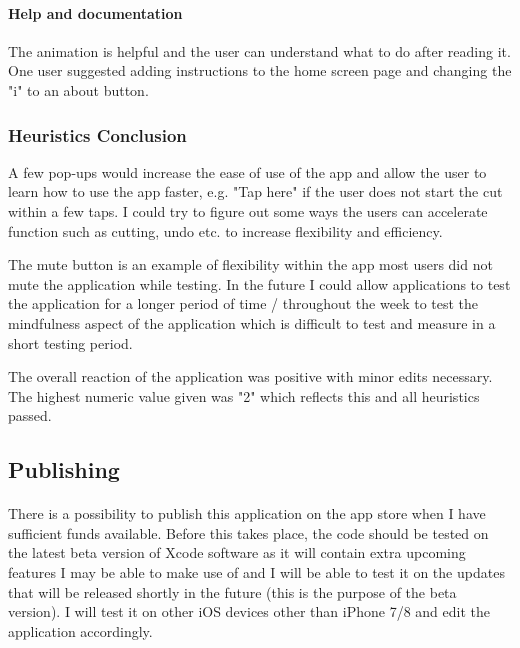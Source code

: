 \documentclass[11pt]{article}
\begin{document}
                \paragraph{Help and documentation} 
                The animation is helpful and the user can understand what to do after reading it. One user suggested adding instructions to the home screen page and changing the "i" to an about button.
                
                \subsubsection{Heuristics Conclusion}
                A few pop-ups would increase the ease of use of the app and allow the user to learn how to use the app faster, e.g. "Tap here" if the user does not start the cut within a few taps. I could try to figure out some ways the users can accelerate function such as cutting, undo etc. to increase flexibility and efficiency. 
                
                The mute button is an example of flexibility within the app most users did not mute the application while testing. In the future I could allow applications to test the application for a longer period of time / throughout the week to test the mindfulness aspect of the application which is difficult to test and measure in a short testing period. 
                
                The overall reaction of the application was positive with minor edits necessary. The highest numeric value given was "2" which reflects this and all heuristics passed. 
        

    \subsection{Publishing}
        \paragraph{}
        There is a possibility to publish this application on the app store when I have sufficient funds available. Before this takes place, the code should be tested on the latest beta version of Xcode software as it will contain extra upcoming features I may be able to make use of and I will be able to test it on the updates that will be released shortly in the future (this is the purpose of the beta version). I will test it on other iOS devices other than iPhone 7/8 and edit the application accordingly.
        
\end{document}
